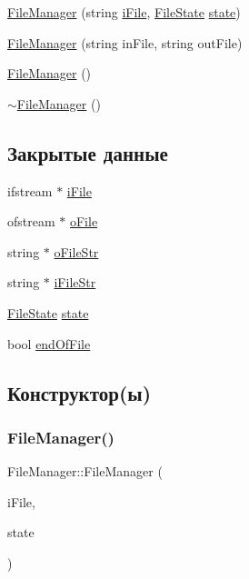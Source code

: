 \begin{DoxyCompactItemize}
\item 
\hyperlink{class_file_manager_a62d69473c95f8df25e44d2466bb00dc5}{File\+Manager} (string \hyperlink{class_file_manager_a91fd33cbb230ed4974a678302e906a8d}{i\+File}, \hyperlink{_structures_8h_a57306ae0f9e356347388234ed69e0ce7}{File\+State} \hyperlink{class_file_manager_a84bbcd4e3807e076ecdbd0e5dfbefa5f}{state})
\item 
\hyperlink{class_file_manager_a2456e56bdcb617c3ee75521cf9dd7057}{File\+Manager} (string in\+File, string out\+File)
\item 
\hyperlink{class_file_manager_a8afd512c06be9daf140cc19d71f9b391}{File\+Manager} ()
\item 
\hyperlink{class_file_manager_abaed33b5b0c13b8a597db9335a1aacfa}{$\sim$\+File\+Manager} ()
\end{DoxyCompactItemize}
\subsection*{Закрытые данные}
\begin{DoxyCompactItemize}
\item 
ifstream $\ast$ \hyperlink{class_file_manager_a91fd33cbb230ed4974a678302e906a8d}{i\+File}
\item 
ofstream $\ast$ \hyperlink{class_file_manager_afe31c07e311212814e4a8ba01c7436a1}{o\+File}
\item 
string $\ast$ \hyperlink{class_file_manager_adf10708d6e8e3b4d329077af4666e147}{o\+File\+Str}
\item 
string $\ast$ \hyperlink{class_file_manager_aaa0e6feed45b6a92ce5c0b509bd9ceb6}{i\+File\+Str}
\item 
\hyperlink{_structures_8h_a57306ae0f9e356347388234ed69e0ce7}{File\+State} \hyperlink{class_file_manager_a84bbcd4e3807e076ecdbd0e5dfbefa5f}{state}
\item 
bool \hyperlink{class_file_manager_ae43001594f1ee182581741d2530620a8}{end\+Of\+File}
\end{DoxyCompactItemize}


\subsection{Конструктор(ы)}
\hypertarget{class_file_manager_a62d69473c95f8df25e44d2466bb00dc5}{}\label{class_file_manager_a62d69473c95f8df25e44d2466bb00dc5} 
\subsubsection{\texorpdfstring{File\+Manager()}{FileManager()}\hspace{0.1cm}{\footnotesize\ttfamily [1/3]}}
{\footnotesize\ttfamily File\+Manager\+::\+File\+Manager (\begin{DoxyParamCaption}\item[{string}]{i\+File,  }\item[{\hyperlink{_structures_8h_a57306ae0f9e356347388234ed69e0ce7}{File\+State}}]{state }\end{DoxyParamCaption})}

